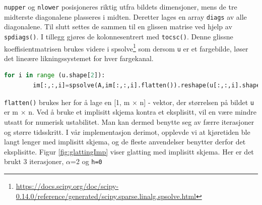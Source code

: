 \texttt{nupper} og \texttt{nlower} posisjoneres riktig utfra bildets dimensjoner, mens de tre midterste diagonalene plasseres i midten. Deretter lages en array \texttt{diags} av alle diagonalene. Til slutt settes de sammen til en glissen matrise ved hjelp av \texttt{spdiags()}. I tillegg gjøres de kolonnesentrert med \texttt{tocsc()}.
Denne glissne koeffisientmatrisen brukes videre i spsolve\footnote{\url{https://docs.scipy.org/doc/scipy-0.14.0/reference/generated/scipy.sparse.linalg.spsolve.html}} som dersom \texttt{u} er et fargebilde, løser det lineære likningssystemet for hver fargekanal.
\begin{lstlisting}[language=Python]
    for i in range (u.shape[2]):
        im[:,:,i]=spsolve(A,im[:,:,i].flatten()).reshape(u[:,:,i].shape)
\end{lstlisting}
\texttt{flatten()} brukes her for å lage en [1, m $\times$ n] - vektor, der størrelsen på bildet \texttt{u} er m $\times$ n. Ved å bruke et implisitt skjema kontra et eksplisitt, vil en være mindre utsatt for numerisk ustabilitet. Man kan dermed benytte seg av færre iterasjoner og større tidsskritt. I vår implementasjon derimot, opplevde vi at kjøretiden ble langt lenger med implisitt skjema, og de fleste anvendelser benytter derfor det eksplisitte. Figur \ref{fig:glattingImp} viser glatting med implisitt skjema. Her er det brukt 3 iterasjoner, $\alpha$=2 og \texttt{h=0}